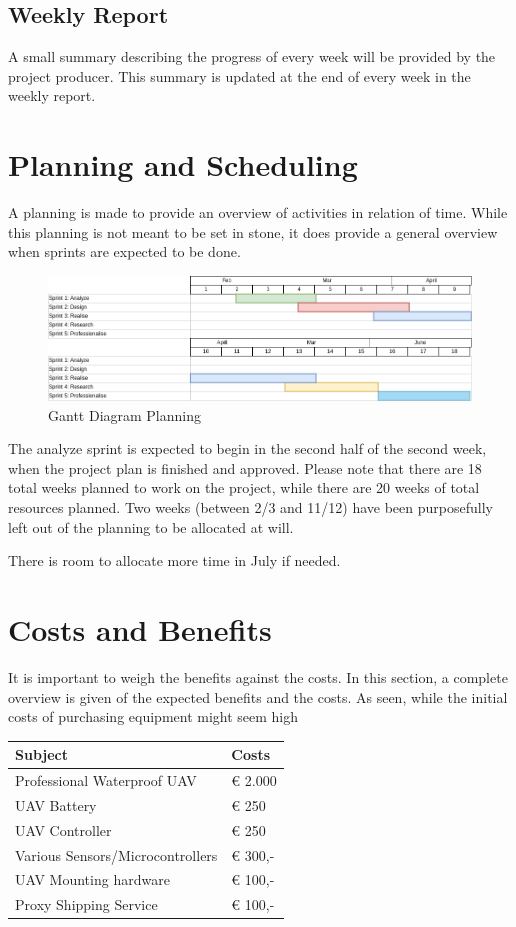 \documentclass[11pt, a4paper]{article}
\begin{document}
\subsection{Weekly Report}\label{projectorganization:weeklyreport}
A small summary describing the progress of every week will be provided by the project producer. This summary is updated at the end of every week in the weekly report.

\section{Planning and Scheduling}
A planning is made to provide an overview of activities in relation of time. While this planning is not meant to be set in stone, it does provide a general overview when sprints are expected to be done.

\begin{figure}[h]
    \center
    \includegraphics[width=1\textwidth]{ganttdiagram.png}
    \caption{Gantt Diagram Planning}
    \label{fig:ganttdiagram}
\end{figure}

The analyze sprint is expected to begin in the second half of the second week, when the project plan is finished and approved. Please note that there are 18 total weeks planned to work on the project, while there are 20 weeks of total resources planned. Two weeks (between 2/3 and 11/12) have been purposefully left out of the planning to be allocated at will. 

There is room to allocate more time in July if needed.

\section{Costs and Benefits}\label{costsandbenefits}
It is important to weigh the benefits against the costs. In this section, a complete overview is given of the expected benefits and the costs. As seen, while the initial costs of purchasing equipment might seem high


\begin{tabular}{ | l | l |}
    \hline
    \textbf{Subject} & \textbf{Costs} \\ \hline
    Professional Waterproof UAV & € 2.000 \\
    UAV Battery & € 250 \\
    UAV Controller & € 250 \\
    Various Sensors/Microcontrollers & € 300,- \\
    UAV Mounting hardware & € 100,- \\
    Proxy Shipping Service & € 100,- \\
    \hline
\end{tabular}
\end{document}
